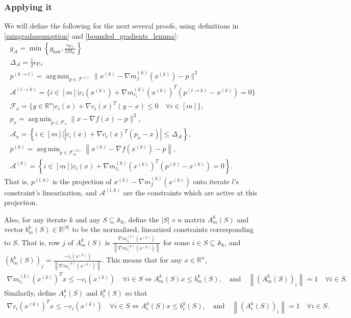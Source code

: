 \documentclass{article}
\theoremstyle{case}
\numberwithin{theorem}{subsection}
\DeclareMathOperator*{\argmin}{arg\,min}
\newcommand{\activeconstraintsk}{{\mathbb A_{k}}}
\newcommand{\feasiblek}{{\mathcal F_m^{(k)}}}
\newcommand{\gk}{{\nabla m_f^{(k)}\left(\xk\right)}}
\newcommand{\gmcik}{{\nabla m_{c_i}^{(k)}\left(\xk\right)}}
\newcommand{\gradf}{\nabla f}
\newcommand{\maxgrad}{{M_{\nabla}}}
\newcommand{\minactivegraddelta}{{\Delta_{\mathcal A}}}
\newcommand{\minactivegrad}{{ g_{\mathcal A} }}
\newcommand{\mingradepsilon}{{\epsilon_{\nabla c}}}
\newcommand{\mingrad}{{ g_{\textrm{low}} }}
\newcommand{\Rn}{\mathbb R^n}
\newcommand{\xk}{x^{(k)}}
\begin{document}
\subsubsection{Applying it}
\color{red}
We will define the following for the next several proofs, using definitions in \cref{mingradassumption} and \cref{bounded_gradients_lemma}:
\begin{align}
\minactivegrad = \min\left\{\mingrad, \frac {\mingradepsilon} {2 \maxgrad}  \right\} \label{define_minactivegrad_orig} \\
\minactivegraddelta = \frac 1 2 \mingradepsilon \label{define_minactivedelta_orig} \\
p^{(k \to l)} = \argmin_{p \in \mathcal F^{(l)}} \|\xk - \gk - p\|^2 \label{bp_define_plk_orig} \\
\mathcal A^{(l \to k)} = \{i \in [m] | c_i(\xk) + \gmcik^T(p^{(l\to k)} - \xk) = 0 \} \label{bp_define_activep} \\
\mathcal F_x = \{ y \in \Rn | c_i(x) + \nabla c_i(x)^T(y - x) \le 0 \quad \forall i \in [m]\}, \label{bp_define_true_linearization} \\
p_x = \argmin_{p \in \mathcal F_x} \|x - \gradf(x) - p\|^2, \label{bp_define_true_projection} \\
\mathcal A_x = \left\{i \in [m] | \left|c_i(x) + \nabla c_i(x)^T(p_x - x)\right| \le \minactivegraddelta \right\}, \label{define_projection_active} \\
p^{(k)} = \argmin_{p \in \feasiblek} \left\| \xk - \nabla f\left(\xk\right) - p \right\|, \label{bp_define_pl} \\
\mathcal A^{(k)} = \left\{i \in [m] | c_i(x) + \gmcik^T\left(p^{(k)} - \xk\right) = 0 \right\}. \label{bp_define_yet_another_thing}
\end{align}
That is, $p^{(l, k)}$ is the projection of $\xk - \gk$ onto iterate $l$'s constraint's linearization,
and $\mathcal A^{(l, k)}$ are the constraints which are active at this projection.

Also, for any iterate $k$ and any $S \subseteq \activeconstraintsk$,
define the $|S|\times n$ matrix $A^k_m(S)$ and vector $b^k_m(S) \in \mathbb R^{|S|}$ 
to be the normalized, linearized constraints corresponding to $S$.
That is, row $j$ of $A^k_m(S)$ is $\frac{\gmcik}{\left\|\gmcik\right\|}$ for some $i \in S\subseteq \activeconstraintsk$, 
and $\left(b^k_m(S)\right)_j = \frac{-c_i(\xk)}{\left\|\gmcik\right\|}$. 
This means that for any $x \in \Rn$,
\begin{align}
\gmcik^T x \le -c_i(\xk) \quad \forall i \in S \Longleftrightarrow A^k_m(S) x \le b^k_m(S), \quad \textrm{and} \quad \left\|\left(A^k_m(S)\right)_i\right\| = 1 \quad \forall i \in S.
\label{define_normalized_model_constraints}
\end{align}
Similarily, define $A^k_c(S)$ and $b^k_c(S)$ so that 
\begin{align}
\nabla c_i\left(\xk\right)^T x \le -c_i(\xk) \quad \forall i \in S \Longleftrightarrow A^k_c(S) x \le b^k_c(S), \quad \textrm{and} \quad \left\|\left(A^k_c(S)\right)_i\right\| = 1 \quad \forall i \in S.
\label{define_normalized_true_constraints}
\end{align}
\end{document}
